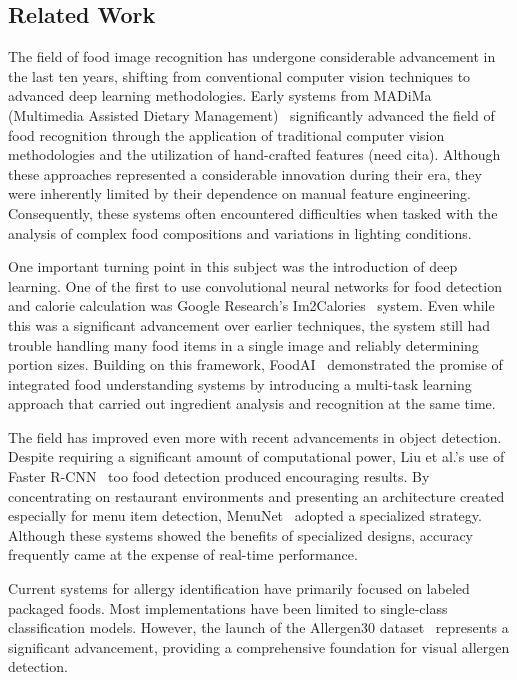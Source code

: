 \documentclass[10pt,twocolumn,letterpaper]{article}
\begin{document}
\subsection{Related Work}

The field of food image recognition has undergone considerable advancement in the last ten years, shifting from conventional computer vision techniques to advanced deep learning methodologies. 
Early systems from MADiMa (Multimedia Assisted Dietary Management)~\cite{madima2017} significantly advanced the field of food recognition through the application of traditional computer vision methodologies and the utilization of hand-crafted features (need cita). 
Although these approaches represented a considerable innovation during their era, they were inherently limited by their dependence on manual feature engineering. 
Consequently, these systems often encountered difficulties when tasked with the analysis of complex food compositions and variations in lighting conditions.

One important turning point in this subject was the introduction of deep learning. 
One of the first to use convolutional neural networks for food detection and calorie calculation was Google Research's Im2Calories~\cite{im2calories} system. 
Even while this was a significant advancement over earlier techniques, the system still had trouble handling many food items in a single image and reliably determining portion sizes. 
Building on this framework, FoodAI~\cite{foodai2024} demonstrated the promise of integrated food understanding systems by introducing a multi-task learning approach that carried out ingredient analysis and recognition at the same time.

The field has improved even more with recent advancements in object detection. Despite requiring a significant amount of computational power, Liu et al.'s use of Faster R-CNN~\cite{fasterrcnn} too food detection produced encouraging results. 
By concentrating on restaurant environments and presenting an architecture created especially for menu item detection, MenuNet~\cite{menunet} adopted a specialized strategy. 
Although these systems showed the benefits of specialized designs, accuracy frequently came at the expense of real-time performance.

Current systems for allergy identification have primarily focused on labeled packaged foods. 
Most implementations have been limited to single-class classification models. 
However, the launch of the Allergen30 dataset~\cite{mishra2022allergen30} represents a significant advancement, providing a comprehensive foundation for visual allergen detection.
\end{document}
